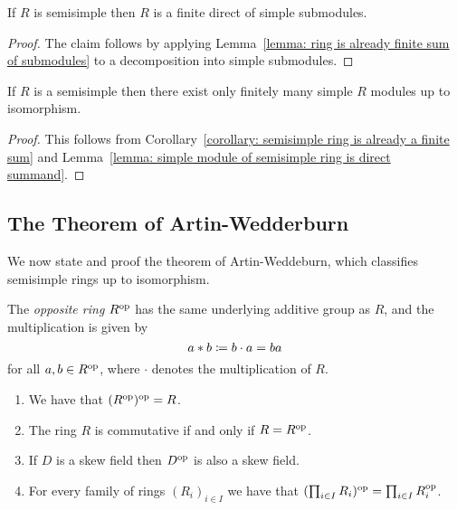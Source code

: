 \begin{corollary}
  \label{corollary: semisimple ring is already a finite sum}
  If $R$ is semisimple then $R$ is a finite direct of simple submodules.
\end{corollary}


\begin{proof}
 The claim follows by applying Lemma~\ref{lemma: ring is already finite sum of submodules} to a decomposition into simple submodules.
\end{proof}


\begin{corollary}
  If $R$ is a semisimple then there exist only finitely many simple $R$ modules up to isomorphism.
\end{corollary}


\begin{proof}
  This follows from Corollary~\ref{corollary: semisimple ring is already a finite sum} and Lemma~\ref{lemma: simple module of semisimple ring is direct summand}.
\end{proof}





\subsection{The Theorem of Artin-Wedderburn}


\begin{fluff}
  We now state and proof the theorem of Artin-Weddeburn, which classifies semisimple rings up to isomorphism.
\end{fluff}


\begin{definition}
  The \emph{opposite ring} $R^{\mathrm{op}}$ has the same underlying additive group as $R$, and the multiplication is given by
  \[
              a * b
    \coloneqq  b \cdot a
    =         ba
  \]
  for all $a, b \in R^{\mathrm{op}}$, where $\cdot$ denotes the multiplication of $R$.
\end{definition}


\begin{remark}
  \label{remark: basic properties of op}
  \leavevmode
  \begin{enumerate}
    \item
      We have that $( R^{\mathrm{op}} )^{\mathrm{op}} = R$.
    \item
      The ring $R$ is commutative if and only if $R = R^{\mathrm{op}}$.
    \item
      If $D$ is a skew field then $D^{\mathrm{op}}$ is also a skew field.
    \item
      For every family of rings $(R_i)_{i \in I}$ we have that $( \prod_{i \in I} R_i )^{\mathrm{op}} = \prod_{i \in I} R_i^{\mathrm{op}}$.
  \end{enumerate}
\end{remark}


